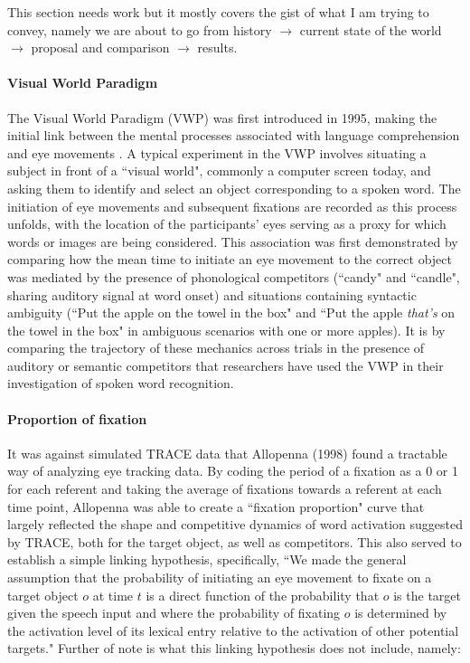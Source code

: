This section needs work but it mostly covers the gist of what I am trying to convey, namely we are about to go from history $\rightarrow$ current state of the world $\rightarrow$ proposal and comparison $\rightarrow$ results.




\paragraph{Visual World Paradigm} The Visual World Paradigm (VWP) was first introduced in 1995, making the initial link between the mental processes associated with language comprehension and eye movements \cite{tanenhaus1995integration}. A typical experiment in the VWP involves situating a subject in front of a ``visual world", commonly a computer screen today, and asking them to identify and select an object corresponding to a spoken word. The initiation of eye movements and subsequent fixations are recorded as this process unfolds, with the location of the participants' eyes serving as a proxy for which words or images are being considered. This association was first demonstrated by comparing how the mean time to initiate an eye movement to the correct object was mediated by the presence of phonological competitors (``candy" and ``candle", sharing auditory signal at word onset) and situations containing syntactic ambiguity (``Put the apple on the towel in the box" and ``Put the apple \textit{that's} on the towel in the box" in ambiguous scenarios with one or more apples). It is by comparing the trajectory of these mechanics across trials in the presence of auditory or semantic competitors that researchers have used the VWP in their investigation of spoken word recognition.




\paragraph{Proportion of fixation} It was against simulated TRACE data that Allopenna (1998) found a tractable way of analyzing eye tracking data. By coding the period of a fixation as a 0 or 1 for each referent and taking the average of fixations towards a referent at each time point, Allopenna was able to create a ``fixation proportion" curve that largely reflected the shape and competitive dynamics of word activation suggested by TRACE, both for the target object, as well as competitors. This also served to establish a simple linking hypothesis, specifically, ``We made the general assumption that the probability of initiating an eye movement to fixate on a target object $o$ at time $t$ is a direct function of the probability that $o$ is the target given the speech input and where the probability of fixating $o$ is determined by the activation level of its lexical entry relative to the activation of other potential targets." Further of note is what this linking hypothesis does not include, namely:


